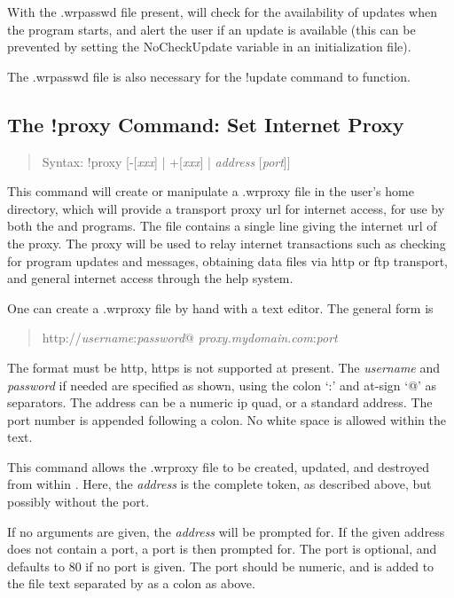 With the {\vt .wrpasswd} file present, {\Xic} will check for the
availability of updates when the program starts, and alert the user if
an update is available (this can be prevented by setting the {\et
NoCheckUpdate} variable in an initialization file).

The {\vt .wrpasswd} file is also necessary for the {\cb !update}
command to function.

\subsection{The {\cb !proxy} Command: Set Internet Proxy}
\begin{quote}
Syntax: {\vt !proxy} [{\vt -}[{\it xxx\/}] {\vt |} {\vt +}[{\it xxx\/}] {\vt |}
 {\it address} [{\it port}]]
\end{quote}
This command will create or manipulate a {\vt .wrproxy} file in the
user's home directory, which will provide a transport proxy url for
internet access, for use by both the {\Xic} and {\WRspice} programs. 
The file contains a single line giving the internet url of the proxy. 
The proxy will be used to relay internet transactions such as checking
for program updates and messages, obtaining data files via http or ftp
transport, and general internet access through the help system.

One can create a {\vt .wrproxy} file by hand with a text editor.  The
general form is
\begin{quote}
{\vt http://}{\it username\/}{\vt :}{\it password\/}{\vt @}{\it
 proxy.mydomain.com\/}{\vt :}{\it port}
\end{quote}
The format must be {\vt http}, {\vt https} is not supported at
present.  The {\it username} and {\it password} if needed are
specified as shown, using the colon `{\vt :}' and at-sign `{\vt @}' as
separators.  The address can be a numeric ip quad, or a standard
address.  The port number is appended following a colon.  No white
space is allowed within the text.

This command allows the {\vt .wrproxy} file to be created, updated,
and destroyed from within {\Xic}.  Here, the {\it address} is the
complete token, as described above, but possibly without the port.

If no arguments are given, the {\it address} will be prompted for.  If
the given address does not contain a port, a port is then prompted
for.  The port is optional, and defaults to 80 if no port is given. 
The port should be numeric, and is added to the file text separated by
as a colon as above.

